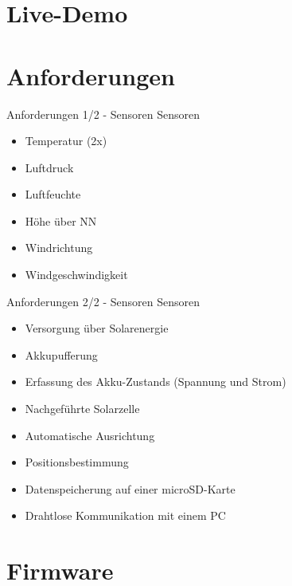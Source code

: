 \documentclass{beamer}
\begin{document}
\section{Live-Demo}

\section{Anforderungen}
\begin{frame}{Anforderungen 1/2 - Sensoren}
	Sensoren
    \begin{itemize}
        \item Temperatur (2x)
        \item Luftdruck
		\item Luftfeuchte
		\item Höhe über NN
		\item Windrichtung
		\item Windgeschwindigkeit
    \end{itemize}
\end{frame}

\begin{frame}{Anforderungen 2/2 - Sensoren}
	Sensoren
    \begin{itemize}
        \item Versorgung über Solarenergie
		\item Akkupufferung
		\item Erfassung des Akku-Zustands (Spannung und Strom)
		\item Nachgeführte Solarzelle
		\item Automatische Ausrichtung
		\item Positionsbestimmung
		\item Datenspeicherung auf einer microSD-Karte
		\item Drahtlose Kommunikation mit einem PC
    \end{itemize}
\end{frame}

\section{Firmware}
\end{document}
